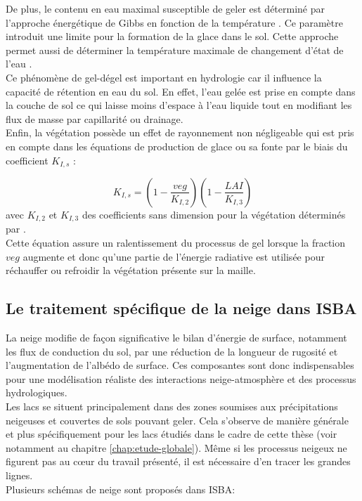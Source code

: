   De plus, le contenu en eau maximal susceptible de geler est déterminé par l'approche énergétique de Gibbs en fonction de la température \citep{fuchs1978}. Ce paramètre introduit une limite pour la formation de la glace dans le sol. Cette approche permet aussi de déterminer la température maximale de changement d'état de l'eau \citep{decharme2016}.\\
  
Ce phénomène de gel-dégel est important en hydrologie car il influence la capacité de rétention en eau du sol. En effet, l'eau gelée est prise en compte dans la couche de sol ce qui laisse moins d'espace à l'eau liquide tout en modifiant les flux de masse par capillarité ou drainage.\\

Enfin, la végétation possède un effet de rayonnement non négligeable qui est pris en compte dans les équations de production de glace ou sa fonte par le biais du coefficient $K_{I,s}$ \citep{boone2000}:

\begin{equation}
K_{I,s} = \left(1-\dfrac{veg}{K_{I,2}}\right) \left(1-\dfrac{LAI}{K_{I,3}}\right)
\end{equation} 
avec $K_{I,2}$ et $K_{I,3}$ des coefficients sans dimension pour la végétation déterminés par \citet{giard2000}.\\
\noindent Cette équation assure un ralentissement du processus de gel lorsque la fraction $veg$ augmente et donc qu'une partie de l'énergie radiative est utilisée pour réchauffer ou refroidir la végétation présente sur la maille.
\subsection{\selectfont Le traitement spécifique de la neige dans ISBA}

La neige modifie de façon significative le bilan d'énergie de surface, notamment les flux de conduction du sol, par une réduction de la longueur de rugosité et l'augmentation de l'albédo de surface. Ces composantes sont donc indispensables pour une modélisation réaliste des interactions neige-atmosphère et des processus hydrologiques. \\
Les lacs se situent principalement dans des zones soumises aux précipitations neigeuses et couvertes de sols pouvant geler. Cela s'observe de manière générale et plus spécifiquement pour les lacs étudiés dans le cadre de cette thèse (voir notamment au chapitre \ref{chap:etude-globale}). Même si les processus neigeux ne figurent pas au cœur du travail présenté, il est nécessaire d'en tracer les grandes lignes. \\
Plusieurs schémas de neige sont proposés dans ISBA:

